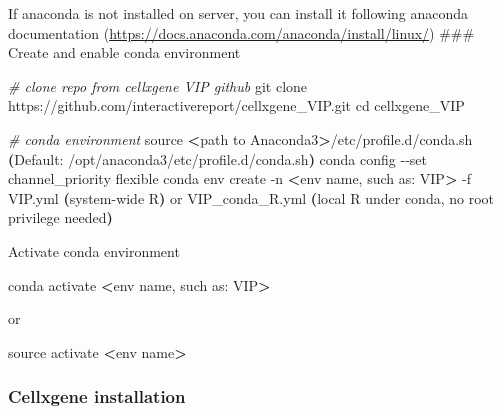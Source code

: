 \documentclass[
]{article}
\newenvironment{Shaded}{\begin{snugshade}}{\end{snugshade}}
\newcommand{\AttributeTok}[1]{\textcolor[rgb]{0.77,0.63,0.00}{#1}}
\newcommand{\BuiltInTok}[1]{#1}
\newcommand{\CommentTok}[1]{\textcolor[rgb]{0.56,0.35,0.01}{\textit{#1}}}
\newcommand{\ErrorTok}[1]{\textcolor[rgb]{0.64,0.00,0.00}{\textbf{#1}}}
\newcommand{\ExtensionTok}[1]{#1}
\newcommand{\FunctionTok}[1]{\textcolor[rgb]{0.00,0.00,0.00}{#1}}
\newcommand{\KeywordTok}[1]{\textcolor[rgb]{0.13,0.29,0.53}{\textbf{#1}}}
\newcommand{\NormalTok}[1]{#1}
\newcommand{\OperatorTok}[1]{\textcolor[rgb]{0.81,0.36,0.00}{\textbf{#1}}}
\newcommand{\VariableTok}[1]{\textcolor[rgb]{0.00,0.00,0.00}{#1}}
\begin{document}
If anaconda is not installed on server, you can install it following anaconda documentation (\url{https://docs.anaconda.com/anaconda/install/linux/})
\#\#\# Create and enable conda environment

\begin{Shaded}
\begin{Highlighting}[]
\CommentTok{\# clone repo from cellxgene VIP github}
\FunctionTok{git}\NormalTok{ clone https://github.com/interactivereport/cellxgene\_VIP.git}
\BuiltInTok{cd}\NormalTok{ cellxgene\_VIP}

\CommentTok{\# conda environment}
\BuiltInTok{source} \OperatorTok{\textless{}}\NormalTok{path to Anaconda3}\OperatorTok{\textgreater{}}\NormalTok{/etc/profile.d/conda.sh }\ErrorTok{(}\ExtensionTok{Default:}\NormalTok{ /opt/anaconda3/etc/profile.d/conda.sh}\KeywordTok{)}
\ExtensionTok{conda}\NormalTok{ config }\AttributeTok{{-}{-}set}\NormalTok{ channel\_priority flexible}
\ExtensionTok{conda}\NormalTok{ env create }\AttributeTok{{-}n} \OperatorTok{\textless{}}\NormalTok{env name, such as: VIP}\OperatorTok{\textgreater{}}\NormalTok{ {-}f VIP.yml }\ErrorTok{(}\ExtensionTok{system{-}wide}\NormalTok{ R}\KeywordTok{)} \ExtensionTok{or}\NormalTok{ VIP\_conda\_R.yml }\ErrorTok{(}\BuiltInTok{local} \VariableTok{R} \VariableTok{under} \VariableTok{conda}\NormalTok{, }\VariableTok{no} \VariableTok{root} \VariableTok{privilege} \VariableTok{needed}\KeywordTok{)}
\end{Highlighting}
\end{Shaded}

Activate conda environment

\begin{Shaded}
\begin{Highlighting}[]
\ExtensionTok{conda}\NormalTok{ activate }\OperatorTok{\textless{}}\NormalTok{env name, such as: VIP}\OperatorTok{\textgreater{}}
\end{Highlighting}
\end{Shaded}

or

\begin{Shaded}
\begin{Highlighting}[]
\BuiltInTok{source}\NormalTok{ activate }\OperatorTok{\textless{}}\NormalTok{env name}\OperatorTok{\textgreater{}}
\end{Highlighting}
\end{Shaded}

\hypertarget{cellxgene-installation}{%
\subsubsection{Cellxgene installation}\label{cellxgene-installation}}
\end{document}
